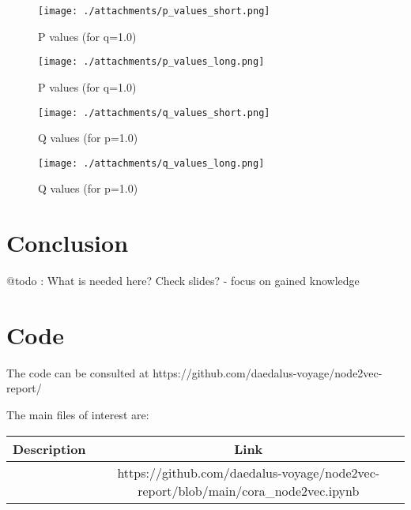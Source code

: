 \documentclass[a4paper,10pt]{article}
\begin{document}
\begin{figure}[!tbp]
  \centering
  \begin{minipage}[b]{0.49\textwidth}
    \texttt{[image: ./attachments/p\_values\_short.png]}
    \caption{P values (for q=1.0)}
    \label{fig:q-values}
  \end{minipage}
  \hfill
  \begin{minipage}[b]{0.49\textwidth}
    \texttt{[image: ./attachments/p\_values\_long.png]}
    \caption{P values (for q=1.0)}
    \label{fig:p-values}
  \end{minipage}
\end{figure}

\begin{figure}[!tbp]
  \centering
  \begin{minipage}[b]{0.49\textwidth}
    \texttt{[image: ./attachments/q\_values\_short.png]}
    \caption{Q values (for p=1.0)}
    \label{fig:q-values}
  \end{minipage}
  \hfill
  \begin{minipage}[b]{0.49\textwidth}
    \texttt{[image: ./attachments/q\_values\_long.png]}
    \caption{Q values (for p=1.0)}
    \label{fig:p-values}
  \end{minipage}
\end{figure}

\section{Conclusion}

@todo : What is needed here? Check slides?
- focus on gained knowledge

\section{Code}

The code can be consulted at https://github.com/daedalus-voyage/node2vec-report/

The main files of interest are:

\begin{tabular}{c c}

  \hline
  Description & Link   \\
  \hline\hline

  & https://github.com/daedalus-voyage/node2vec-report/blob/main/cora_node2vec.ipynb \\ \hline
  

\end{tabular}


\end{document}
